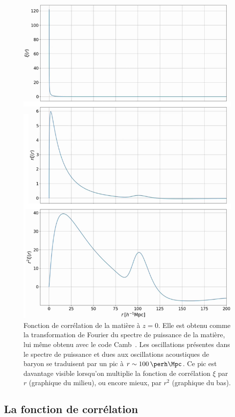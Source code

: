 \documentclass[11pt, twoside, a4paper, openright]{report}
\begin{document}
\begin{figure}
  \centering
  \includegraphics[scale=0.45, angle=270]{xi_camb}
  \caption{Fonction de corrélation de la matière à $z = 0$. Elle est obtenu comme la transformation de Fourier du spectre de puissance de la matière, lui même obtenu avec le code Camb~\autocite{Lewis1999}. Les oscillations présentes dans le spectre de puissance et dues aux oscillations acoustiques de baryon se traduisent par un pic à $r \sim \SI{100}{\perh\Mpc}$. Ce pic est davantage visible lorsqu'on multiplie la fonction de corrélation $\xi$ par $r$ (graphique du milieu), ou encore mieux, par $r^2$ (graphique du bas).}
  \label{fig:xi_camb}
\end{figure}

\subsection{La fonction de corrélation}
\end{document}
